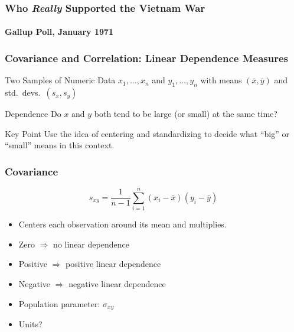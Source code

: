 \begin{frame}
\frametitle{Who \emph{Really} Supported the Vietnam War}
\framesubtitle{Gallup Poll, January 1971}
\begin{center}
\end{center}

\end{frame}
\begin{frame}
\frametitle{Covariance and Correlation: Linear Dependence Measures}

\begin{block}{Two Samples of Numeric Data}
  $x_1, \hdots, x_n$ and $y_1, \hdots, y_n$ with means $(\bar{x}, \bar{y})$ and std.\ devs.\ $(s_x, s_y)$
\end{block}

\begin{block}{Dependence}
Do $x$ and $y$ both tend to be large (or small) at the same time?
\end{block}


\begin{block}{Key Point}
Use the idea of centering and standardizing to decide what ``big'' or ``small'' means in this context.
\end{block}

\end{frame}
%
%
\begin{frame}
\frametitle{Covariance}
	$$s_{xy} = \frac{1}{n-1} \sum_{i=1}^n (x_i -\bar{x})(y_i - \bar{y})$$

\begin{itemize}
	\item Centers each observation around its mean and multiplies.
	\item Zero $\Rightarrow$ no linear dependence
	\item Positive $\Rightarrow$ positive linear dependence
	\item Negative $\Rightarrow$ negative linear dependence
	\item Population parameter: $\sigma_{xy}$
	\item Units?
\end{itemize}
\end{frame}
